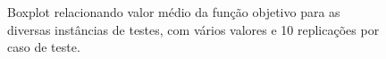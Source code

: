 \documentclass[12pt]{article}
\begin{document}
\begin{figure}
{   }
   \caption{Boxplot relacionando valor médio da função objetivo para as diversas 
      instâncias de testes, com vários valores \bm{$\alpha$} e 10 replicações
      por caso de teste.}
\end{figure}
\end{document}
